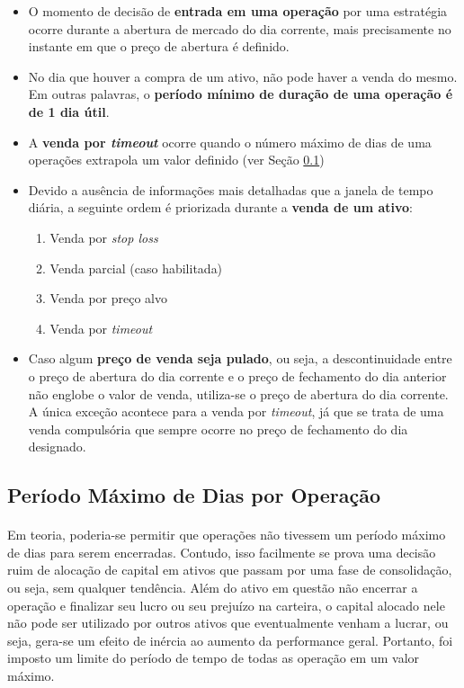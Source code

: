 \begin{itemize}
    \item O momento de decisão de \textbf{entrada em uma operação} por uma estratégia ocorre durante a abertura de mercado do dia corrente, mais precisamente no instante em que o preço de abertura é definido.

    \item No dia que houver a compra de um ativo, não pode haver a venda do mesmo. Em outras palavras, o \textbf{período mínimo de duração de uma operação é de 1 dia útil}.

    \item A \textbf{venda por \textit{timeout}} ocorre quando o número máximo de dias de uma operações extrapola um valor definido (ver Seção \ref{sub:max_op_days})

    \item Devido a ausência de informações mais detalhadas que a janela de tempo diária, a seguinte ordem é priorizada durante a \textbf{venda de um ativo}:

    \begin{enumerate}
        \item Venda por \textit{stop loss}
        \item Venda parcial (caso habilitada)
        \item Venda por preço alvo
        \item Venda por \textit{timeout}
    \end{enumerate}

    \item Caso algum \textbf{preço de venda seja pulado}, ou seja, a descontinuidade entre o preço de abertura do dia corrente e o preço de fechamento do dia anterior não englobe o valor de venda, utiliza-se o preço de abertura do dia corrente. A única exceção acontece para a venda por \textit{timeout}, já que se trata de uma venda compulsória que sempre ocorre no preço de fechamento do dia designado.

\end{itemize}



\FloatBarrier
\subsection{Período Máximo de Dias por Operação}
\label{sub:max_op_days}

\paragraph{} Em teoria, poderia-se permitir que operações não tivessem um período máximo de dias para serem encerradas. Contudo, isso facilmente se prova uma decisão ruim de alocação de capital em ativos que passam por uma fase de consolidação, ou seja, sem qualquer tendência. Além do ativo em questão não encerrar a operação e finalizar seu lucro ou seu prejuízo na carteira, o capital alocado nele não pode ser utilizado por outros ativos que eventualmente venham a lucrar, ou seja, gera-se um efeito de inércia ao aumento da performance geral. Portanto, foi imposto um limite do período de tempo de todas as operação em um valor máximo.

